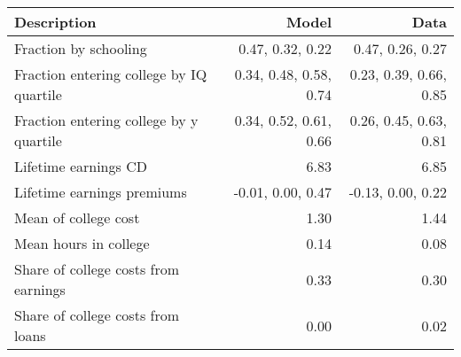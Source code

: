 \begin{tabular}{lrr}
\hline
Description & Model  & Data  \\ 
\hline
Fraction by schooling & 0.47, 0.32, 0.22  & 0.47, 0.26, 0.27  \\ 
Fraction entering college by IQ quartile & 0.34, 0.48, 0.58, 0.74  & 0.23, 0.39, 0.66, 0.85  \\ 
Fraction entering college by y quartile & 0.34, 0.52, 0.61, 0.66  & 0.26, 0.45, 0.63, 0.81  \\ 
Lifetime earnings CD & 6.83  & 6.85  \\ 
Lifetime earnings premiums & -0.01, 0.00, 0.47  & -0.13, 0.00, 0.22  \\ 
Mean of college cost & 1.30  & 1.44  \\ 
Mean hours in college & 0.14  & 0.08  \\ 
Share of college costs from earnings & 0.33  & 0.30  \\ 
Share of college costs from loans & 0.00  & 0.02  \\ 
\hline
\end{tabular}%
